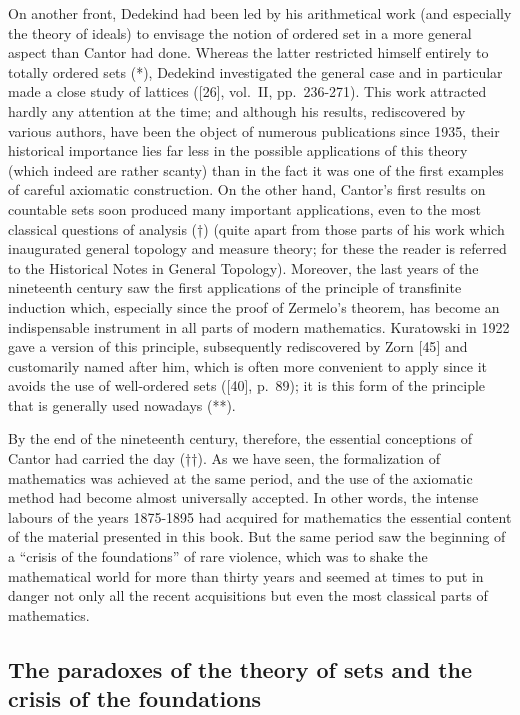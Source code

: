 On another front, Dedekind had been led by his arithmetical work (and especially the theory of ideals) to envisage the notion of ordered set in a more general aspect than Cantor had done. Whereas the latter restricted himself entirely to totally ordered sets (*), Dedekind investigated the general case and in particular made a close study of lattices ({[}26{]}, vol.~II, pp.~236-271). This work attracted hardly any attention at the time; and although his results, rediscovered by various authors, have been the object of numerous publications since 1935, their historical importance lies far less in the possible applications of this theory (which indeed are rather scanty) than in the fact it was one of the first examples of careful axiomatic construction. On the other hand, Cantor's first results on countable sets soon produced many important applications, even to the most classical questions of analysis (†) (quite apart from those parts of his work which inaugurated general topology and measure theory; for these the reader is referred to the Historical Notes in General Topology). Moreover, the last years of the nineteenth century saw the first applications of the principle of transfinite induction which, especially since the proof of Zermelo's theorem, has become an indispensable instrument in all parts of modern mathematics. Kuratowski in 1922 gave a version of this principle, subsequently rediscovered by Zorn {[}45{]} and customarily named after him, which is often more convenient to apply since it avoids the use of well-ordered sets ({[}40{]}, p.~89); it is this form of the principle that is generally used nowadays (**).

By the end of the nineteenth century, therefore, the essential conceptions of Cantor had carried the day (††). As we have seen, the formalization of mathematics was achieved at the same period, and the use of the axiomatic method had become almost universally accepted. In other words, the intense labours of the years 1875-1895 had acquired for mathematics the essential content of the material presented in this book. But the same period saw the beginning of a ``crisis of the foundations'' of rare violence, which was to shake the mathematical world for more than thirty years and seemed at times to put in danger not only all the recent acquisitions but even the most classical parts of mathematics.

\subsection*{The paradoxes of the theory of sets and the crisis of the foundations}


